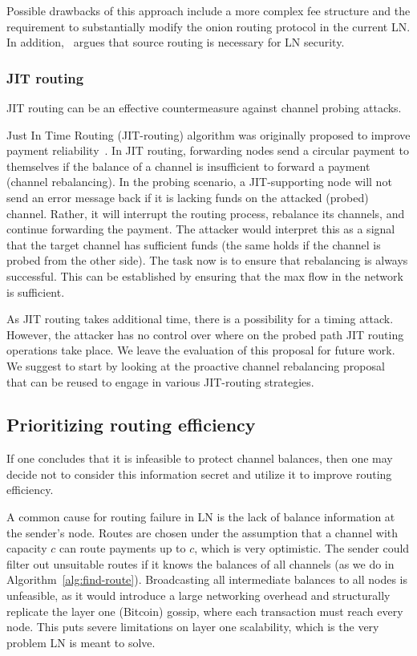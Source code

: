 Possible drawbacks of this approach include a more complex fee structure and the requirement to substantially modify the onion routing protocol in the current LN.
In addition,~\cite{Malavolta2019} argues that source routing is necessary for LN security.

\subsubsection{JIT routing}
JIT routing can be an effective countermeasure against channel probing attacks.

Just In Time Routing (JIT-routing) algorithm was originally proposed to improve payment reliability~\cite{Pickhardt2019}.
In JIT routing, forwarding nodes send a circular payment to themselves if the balance of a channel is insufficient to forward a payment (channel rebalancing).
In the probing scenario, a JIT-supporting node will not send an error message back if it is lacking funds on the attacked (probed) channel.
Rather, it will interrupt the routing process, rebalance its channels, and continue forwarding the payment.
The attacker would interpret this as a signal that the target channel has sufficient funds (the same holds if the channel is probed from the other side).
The task now is to ensure that rebalancing is always successful.
This can be established by ensuring that the max flow in the network is sufficient.

As JIT routing takes additional time, there is a possibility for a timing attack. 
However, the attacker has no control over where on the probed path JIT routing operations take place. 
We leave the evaluation of this proposal for future work.
We suggest to start by looking at the proactive channel rebalancing proposal~\cite{Pickhardt2019a} that can be reused to engage in various JIT-routing strategies. 

\subsection{Prioritizing routing efficiency}
If one concludes that it is infeasible to protect channel balances, then one may decide not to consider this information secret and utilize it to improve routing efficiency.

A common cause for routing failure in LN is the lack of balance information at the sender's node.
Routes are chosen under the assumption that a channel with capacity $c$ can route payments up to $c$, which is very optimistic.
The sender could filter out unsuitable routes if it knows the balances of all channels (as we do in Algorithm~\ref{alg:find-route}).
Broadcasting all intermediate balances to all nodes is unfeasible, as it would introduce a large networking overhead and structurally replicate the layer one (Bitcoin) gossip, where each transaction must reach every node.
This puts severe limitations on layer one scalability, which is the very problem LN is meant to solve.


